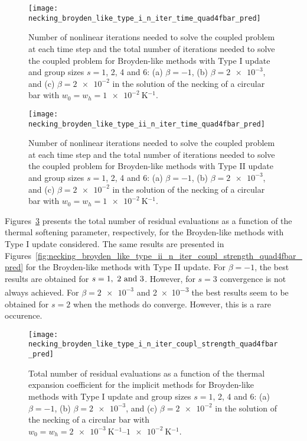 \begin{figure}[htbp]
  \centering
  \texttt{[image: necking\_broyden\_like\_type\_i\_n\_iter\_time\_quad4fbar\_pred]}
  \caption{
Number of nonlinear iterations needed to solve the coupled problem at each time step and the total number of iterations needed to solve the coupled problem for Broyden-like methods with Type I update and group sizes \(s=1\), 2, 4 and 6: (a) \(\beta=-1\), (b) \(\beta=\num{2e-3}\), and (c) \(\beta=\num{2e-2}\) in the solution of the necking of a circular bar with \(w_0=w_h=\SI{1e-2}{\kelvin^{-1}}\).}
\label{fig:necking_broyden_like_type_i_n_iter_time_quad4fbar_pred}
\end{figure}

\begin{figure}[htbp]
  \centering
  \texttt{[image: necking\_broyden\_like\_type\_ii\_n\_iter\_time\_quad4fbar\_pred]}
  \caption{Number of nonlinear iterations needed to solve the coupled problem at each time step and the total number of iterations needed to solve the coupled problem for Broyden-like methods with Type II update and group sizes \(s=1\), 2, 4 and 6: (a) \(\beta=-1\), (b) \(\beta=\num{2e-3}\), and (c) \(\beta=\num{2e-2}\) in the solution of the necking of a circular bar with \(w_0=w_h=\SI{1e-2}{\kelvin^{-1}}\).}
\label{fig:necking_broyden_like_type_ii_n_iter_time_quad4fbar_pred}
\end{figure}

Figures~\ref{fig:necking_broyden_like_type_i_n_iter_coupl_strength_quad4fbar_pred} presents the total number of residual evaluations as a function of the thermal softening parameter, respectively, for the Broyden-like methods with Type I update considered.
The same results are presented in Figures~\ref{fig:necking_broyden_like_type_ii_n_iter_coupl_strength_quad4fbar_pred} for the Broyden-like methods with Type II update.
For \(\beta=-1\), the best results are obtained for \(s=\SIlist{1; 2; 3}{}\).
However, for \(s=3\) convergence is not always achieved.
For \(\beta=\num{2e-3}\) and \num{2e-3} the best results seem to be obtained for \(s=2\) when the methods do converge.
However, this is a rare occurence.

\begin{figure}[htbp]
  \centering
  \texttt{[image: necking\_broyden\_like\_type\_i\_n\_iter\_coupl\_strength\_quad4fbar\_pred]}
  \caption{Total number of residual evaluations as a function of the thermal expansion coefficient for the implicit methods for Broyden-like methods with Type I update and group sizes \(s=1\), 2, 4 and 6: (a) \(\beta=-1\), (b) \(\beta=\num{2e-3}\), and (c) \(\beta=\num{2e-2}\) in the solution of the necking of a circular bar with \(w_0=w_h=\SIrange{2e-3}{1e-2}{\kelvin^{-1}}\).}
\label{fig:necking_broyden_like_type_i_n_iter_coupl_strength_quad4fbar_pred}
\end{figure}

